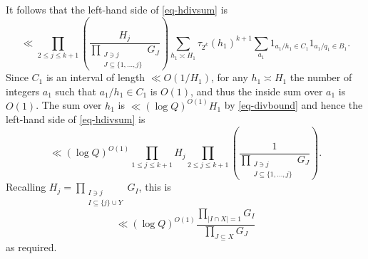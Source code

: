 \documentclass[11pt,letterpaper]{amsart}
\newcommand{\abs}[1]{\left\lvert #1\right\rvert}
\newcommand{\brac}[1]{\left( #1\right)}
\newcommand{\ogcd}[2]{\gcd(#1,#2)}
\newcommand{\bracgcd}[2]{\gcd\brac{#1,#2}}
\theoremstyle{definition}
\begin{document}
It follows that the left-hand side of \eqref{eq-hdivsum} is 
\[\ll \prod_{2\leq j\leq k+1}\brac{\frac{H_j}{\prod_{\substack{J\ni j \\ J\subseteq \{1,\ldots,j\}}}G_J}}\sum_{h_1\asymp H_1}\tau_{2^{k}}(h_1)^{k+1}\sum_{a_1} 1_{a_1/h_1 \in C_1}1_{a_1/q_1\in B_1}.\]
Since $C_1$ is an interval of length $\ll O(1/H_1)$, for any $h_1 \asymp H_1$ the number of integers $a_1$ such that $a_1/h_1 \in C_1$ is $O(1)$, and thus the inside sum over $a_1$ is $O(1)$.
The sum over $h_1$ is $\ll (\log Q)^{O(1)}H_1$ by \eqref{eq-divbound} and hence the left-hand side of \eqref{eq-hdivsum} is 
\[\ll (\log Q)^{O(1)}\prod_{1\leq j\leq k+1}H_j\prod_{2\leq j\leq k+1}\brac{\frac{1}{\prod_{\substack{J\ni j \\ J\subseteq \{1,\ldots,j\}}}G_J}}.\]
Recalling $H_j= \prod_{\substack{I \ni j\\ I\subseteq \{j\} \cup Y}}G_I$, this is
\[\ll (\log Q)^{O(1)}\frac{\prod_{\abs{I\cap X}=1}G_I}{\prod_{J\subseteq X}G_J}\]
as required.
\end{document}
